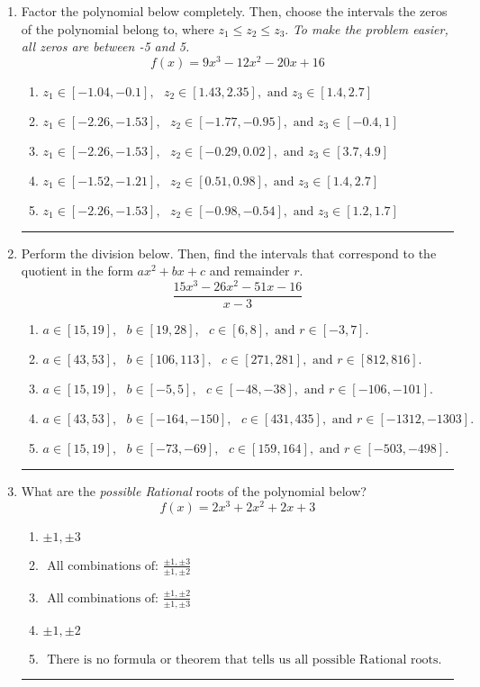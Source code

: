 \documentclass[14pt]{extbook}
\newcommand{\litem}[1]{\item#1\hspace*{-1cm}\rule{\textwidth}{0.4pt}}
\begin{document}
\begin{enumerate}
{\begin{enumerate}[label=\Alph*.]
\end{enumerate} }
\litem{
Factor the polynomial below completely. Then, choose the intervals the zeros of the polynomial belong to, where $z_1 \leq z_2 \leq z_3$. \textit{To make the problem easier, all zeros are between -5 and 5.}\[ f(x) = 9x^{3} -12 x^{2} -20 x + 16 \]\begin{enumerate}[label=\Alph*.]
\item \( z_1 \in [-1.04, -0.1], \text{   }  z_2 \in [1.43, 2.35], \text{   and   } z_3 \in [1.4, 2.7] \)
\item \( z_1 \in [-2.26, -1.53], \text{   }  z_2 \in [-1.77, -0.95], \text{   and   } z_3 \in [-0.4, 1] \)
\item \( z_1 \in [-2.26, -1.53], \text{   }  z_2 \in [-0.29, 0.02], \text{   and   } z_3 \in [3.7, 4.9] \)
\item \( z_1 \in [-1.52, -1.21], \text{   }  z_2 \in [0.51, 0.98], \text{   and   } z_3 \in [1.4, 2.7] \)
\item \( z_1 \in [-2.26, -1.53], \text{   }  z_2 \in [-0.98, -0.54], \text{   and   } z_3 \in [1.2, 1.7] \)

\end{enumerate} }
\litem{
Perform the division below. Then, find the intervals that correspond to the quotient in the form $ax^2+bx+c$ and remainder $r$.\[ \frac{15x^{3} -26 x^{2} -51 x -16}{x -3} \]\begin{enumerate}[label=\Alph*.]
\item \( a \in [15, 19], \text{   } b \in [19, 28], \text{   } c \in [6, 8], \text{   and   } r \in [-3, 7]. \)
\item \( a \in [43, 53], \text{   } b \in [106, 113], \text{   } c \in [271, 281], \text{   and   } r \in [812, 816]. \)
\item \( a \in [15, 19], \text{   } b \in [-5, 5], \text{   } c \in [-48, -38], \text{   and   } r \in [-106, -101]. \)
\item \( a \in [43, 53], \text{   } b \in [-164, -150], \text{   } c \in [431, 435], \text{   and   } r \in [-1312, -1303]. \)
\item \( a \in [15, 19], \text{   } b \in [-73, -69], \text{   } c \in [159, 164], \text{   and   } r \in [-503, -498]. \)

\end{enumerate} }
\litem{
What are the \textit{possible Rational} roots of the polynomial below?\[ f(x) = 2x^{3} +2 x^{2} +2 x + 3 \]\begin{enumerate}[label=\Alph*.]
\item \( \pm 1,\pm 3 \)
\item \( \text{ All combinations of: }\frac{\pm 1,\pm 3}{\pm 1,\pm 2} \)
\item \( \text{ All combinations of: }\frac{\pm 1,\pm 2}{\pm 1,\pm 3} \)
\item \( \pm 1,\pm 2 \)
\item \( \text{ There is no formula or theorem that tells us all possible Rational roots.} \)


\end{enumerate}}
\end{enumerate}
\end{document}
